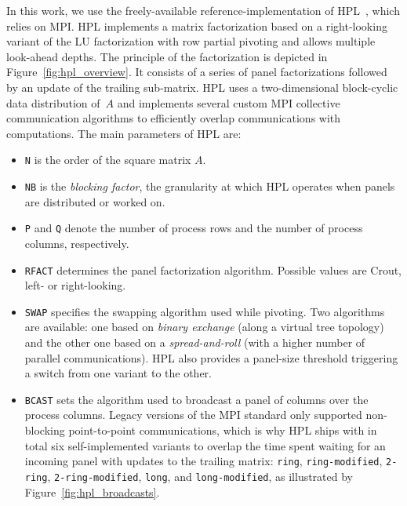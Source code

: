         In this work, we use the freely-available reference-implementation of HPL~\cite{hpl}, which relies on MPI.  HPL
        implements a matrix factorization based on a right-looking variant of the LU factorization with row partial pivoting
        and allows multiple look-ahead depths. The principle of the factorization is depicted in
        Figure~\ref{fig:hpl_overview}. It consists of a series of panel factorizations followed by an update of the trailing
        sub-matrix.  HPL uses a two-dimensional block-cyclic data distribution of $A$ and implements several custom MPI
        collective communication algorithms to efficiently overlap communications with computations.
        The main parameters of HPL are:
        \begin{itemize}
            \item \texttt{N} is the order of the square matrix $A$.
            \item \texttt{NB} is the \emph{blocking factor}, \ie the granularity at which HPL operates when panels are
                distributed or worked on.
            \item \texttt{P} and \texttt{Q} denote the number of process rows and the number of process columns,
                respectively.
            \item \texttt{RFACT} determines the panel factorization algorithm. Possible values are Crout, left- or
                right-looking.
            \item \texttt{SWAP} specifies the swapping algorithm used while pivoting. Two algorithms are available: one
                based on \emph{binary exchange} (along a virtual tree topology) and the other one based on a
                \emph{spread-and-roll} (with a higher number of parallel communications). HPL also provides a panel-size
                threshold triggering a switch from one variant to the other.
            \item \texttt{BCAST} sets the algorithm used to broadcast a panel of columns over the process columns. Legacy
                versions of the MPI standard only supported non-blocking point-to-point communications, which is why HPL
                ships with in total six self-implemented variants to overlap the time spent waiting for an incoming
                panel with updates to the trailing matrix: \texttt{ring}, \texttt{ring-modified}, \texttt{2-ring},
                \texttt{2-ring-modified}, \texttt{long}, and \texttt{long-modified}, as illustrated by
                Figure~\ref{fig:hpl_broadcasts}.


\end{itemize}
